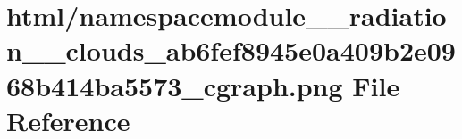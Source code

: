 \hypertarget{namespacemodule____radiation____clouds__ab6fef8945e0a409b2e0968b414ba5573__cgraph_8png}{}\section{html/namespacemodule\+\_\+\+\_\+radiation\+\_\+\+\_\+clouds\+\_\+ab6fef8945e0a409b2e0968b414ba5573\+\_\+cgraph.png File Reference}
\label{namespacemodule____radiation____clouds__ab6fef8945e0a409b2e0968b414ba5573__cgraph_8png}
